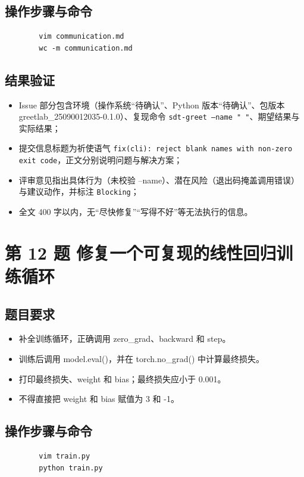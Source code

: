 \documentclass{article}
\begin{document}
    \subsection*{操作步骤与命令}
      \begin{verbatim}
        vim communication.md
        wc -m communication.md
      \end{verbatim}
    \subsection*{结果验证}
      \begin{itemize}
        \item Issue 部分包含环境（操作系统“待确认”、Python 版本“待确认”、包版本 greetlab\_25090012035-0.1.0）、复现命令 \texttt{sdt-greet --name "   "}、期望结果与实际结果；
        \item 提交信息标题为祈使语气 \allowbreak\texttt{fix(cli): reject blank names with non-zero exit code}，正文分别说明问题与解决方案；
        \item 评审意见指出具体行为（未校验 --name）、潜在风险（退出码掩盖调用错误）与建议动作，并标注 \texttt{Blocking}；
        \item 全文 400 字以内，无“尽快修复”“写得不好”等无法执行的信息。
      \end{itemize}

  \newpage
  \section{第 12 题 修复一个可复现的线性回归训练循环}
    \subsection*{题目要求}
      \begin{itemize}
        \item 补全训练循环，正确调用 zero\_grad、backward 和 step。
        \item 训练后调用 model.eval()，并在 torch.no\_grad() 中计算最终损失。
        \item 打印最终损失、weight 和 bias；最终损失应小于 0.001。
        \item 不得直接把 weight 和 bias 赋值为 3 和 -1。
      \end{itemize}
    \subsection*{操作步骤与命令}
      \begin{verbatim}
        vim train.py  
        python train.py
      \end{verbatim}
\end{document}
